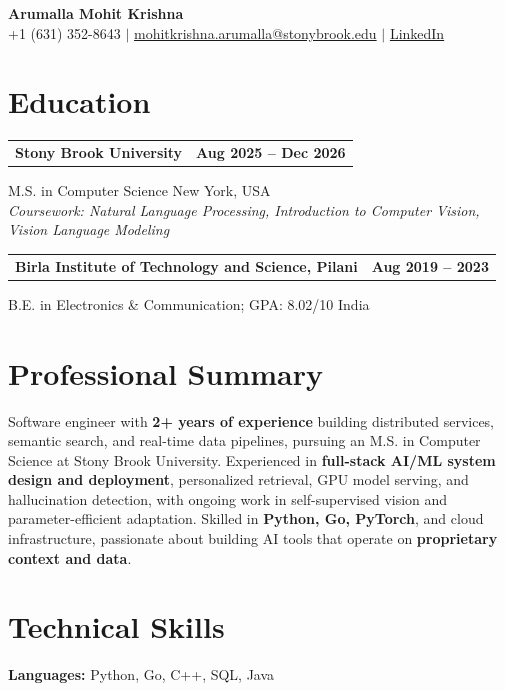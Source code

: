 \documentclass[letterpaper,10pt]{article}
\makeatletter
\newcommand{\entry}[2]{%
  \noindent
  \begin{tabularx}{\linewidth}
    {@{}>{\raggedright\arraybackslash}X@{\hspace{6pt}}r@{}}
    \textbf{#1} & #2
  \end{tabularx}\par
}
\makeatother
\begin{document}
\begin{center}
    {\LARGE\bfseries Arumalla Mohit Krishna}\\[3pt]
    +1 (631) 352-8643 $|$
    \href{mailto:mohitkrishna.arumalla@stonybrook.edu}
    {mohitkrishna.arumalla@stonybrook.edu} $|$
    \href{https://linkedin.com/in/mohit-krishna-arumalla}
    {LinkedIn}
\end{center}
\vspace{-8pt}

\section{Education}

\entry
  {\textbf{Stony Brook University}}
  {\textbf{Aug 2025 -- Dec 2026}}

M.S. in Computer Science \hfill New York, USA\\
\textit{
Coursework: Natural Language Processing,
Introduction to Computer Vision, Vision Language Modeling
}
\vspace{3pt}

\entry
  {\textbf{Birla Institute of Technology and Science, Pilani}}
  {\textbf{Aug 2019 -- 2023}}

B.E. in Electronics \& Communication; GPA: 8.02/10 \hfill India
\section{Professional Summary}

Software engineer with \textbf{2+ years of experience} building distributed services,
semantic search, and real-time data pipelines, pursuing an M.S. in Computer
Science at Stony Brook University. Experienced in \textbf{full-stack AI/ML system design and deployment}, personalized
retrieval, GPU model serving, and hallucination detection, with ongoing work
in self-supervised vision and parameter-efficient adaptation. Skilled in
\textbf{Python, Go, PyTorch}, and cloud infrastructure, passionate about
building AI tools that operate on \textbf{proprietary context and data}.

\section{Technical Skills}

\textbf{Languages:}
Python, Go, C++, SQL, Java\\
\end{document}
